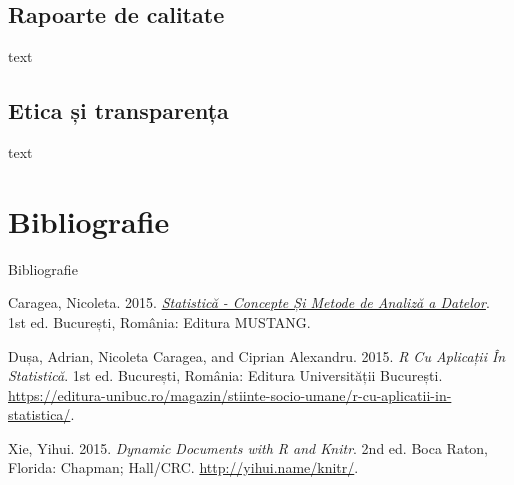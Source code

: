 \documentclass[
  11pt,
  b5paper,
  nottoc]{book}
\newlength{\cslhangindent}
\newenvironment{CSLReferences}[2] %
 {\begin{list}{}{%
  \setlength{\itemindent}{0pt}
  \setlength{\leftmargin}{0pt}
  \setlength{\parsep}{0pt}
  \ifodd #1
   \setlength{\leftmargin}{\cslhangindent}
   \setlength{\itemindent}{-1\cslhangindent}
  \fi
  \setlength{\itemsep}{#2\baselineskip}}}
 {\end{list}}
\begin{document}
\section{Rapoarte de calitate}\label{rapoarte-de-calitate}

text

\section{Etica și transparența}\label{etica-ux219i-transparenux21ba}

text


\chapter*{Bibliografie}\label{bibliografie}


Bibliografie

\label{refs}
\begin{CSLReferences}{1}{0}
Caragea, Nicoleta. 2015. \emph{\href{}{Statistică - Concepte Și Metode
de Analiză a Datelor}}. 1st ed. București, România: Editura MUSTANG.

Dușa, Adrian, Nicoleta Caragea, and Ciprian Alexandru. 2015. \emph{{R}
Cu Aplicații În Statistică}. 1st ed. București, România: Editura
Universității București.
\url{https://editura-unibuc.ro/magazin/stiinte-socio-umane/r-cu-aplicatii-in-statistica/}.

Xie, Yihui. 2015. \emph{Dynamic Documents with {R} and Knitr}. 2nd ed.
Boca Raton, Florida: Chapman; Hall/CRC. \url{http://yihui.name/knitr/}.

\end{CSLReferences}


\backmatter
\end{document}
